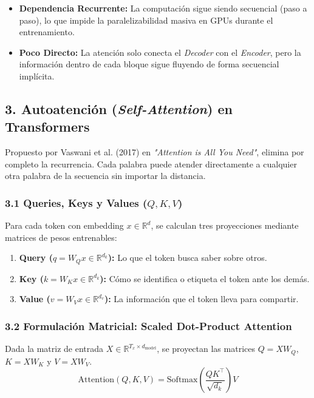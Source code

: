 \begin{itemize}
	\item \textbf{Dependencia Recurrente:} La computación sigue siendo secuencial (paso a paso), lo que impide la paralelizabilidad masiva en GPUs durante el entrenamiento.
	\item \textbf{Poco Directo:} La atención solo conecta el \emph{Decoder} con el \emph{Encoder}, pero la información dentro de cada bloque sigue fluyendo de forma secuencial implícita.
\end{itemize}

\subsection{3. Autoatención (\emph{Self-Attention}) en Transformers}

Propuesto por Vaswani et al. (2017) en \emph{"Attention is All You Need"}, elimina por completo la recurrencia. Cada palabra puede atender directamente a cualquier otra palabra de la secuencia sin importar la distancia.

\subsubsection{3.1 Queries, Keys y Values ($Q, K, V$)}

Para cada token con embedding $x \in \mathbb{R}^d$, se calculan tres proyecciones mediante matrices de pesos entrenables:
\begin{enumerate}
	\item \textbf{Query ($q = W_Q x \in \mathbb{R}^{d_k}$):} Lo que el token busca saber sobre otros.
	\item \textbf{Key ($k = W_K x \in \mathbb{R}^{d_k}$):} Cómo se identifica o etiqueta el token ante los demás.
	\item \textbf{Value ($v = W_V x \in \mathbb{R}^{d_v}$):} La información que el token lleva para compartir.
\end{enumerate}

\subsubsection{3.2 Formulación Matricial: Scaled Dot-Product Attention}

Dada la matriz de entrada $X \in \mathbb{R}^{T_x \times d_{\text{model}}}$, se proyectan las matrices $Q = X W_Q$, $K = X W_K$ y $V = X W_V$.
$$\text{Attention}(Q, K, V) = \text{Softmax}\left( \frac{Q K^\top}{\sqrt{d_k}} \right) V$$

